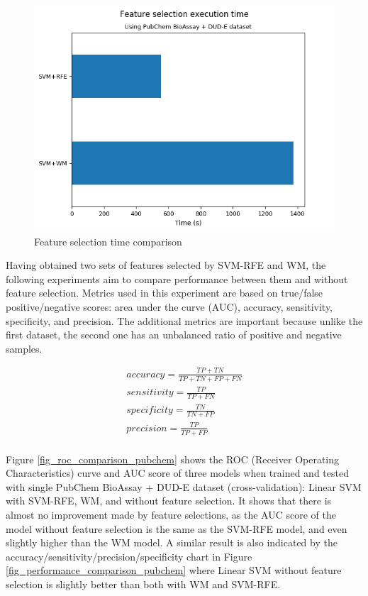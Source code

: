 \documentclass[conference]{IEEEtran}
\begin{document}
\begin{figure}
	\includegraphics[scale=0.5]{../images/feature_selection_time_comparison.png}
	\caption{Feature selection time comparison}
	\label{fig_feature_selection_time_comparison}
\end{figure}

Having obtained two sets of features selected by SVM-RFE and WM, the following experiments aim to compare performance between them and without feature selection. Metrics used in this experiment are based on true/false positive/negative scores: area under the curve (AUC), accuracy, sensitivity, specificity, and precision. The additional metrics are important because unlike the first dataset, the second one has an unbalanced ratio of positive and negative samples.

\begin{align}
	accuracy = \frac{TP + TN}{TP + TN + FP + FN} \\
	sensitivity = \frac{TP}{TP + FN} \\	
	specificity = \frac{TN}{TN + FP} \\		
	precision = \frac{TP}{TP + FP} \\			
	\label{eq_performance_metrics}
\end{align}

Figure \ref{fig_roc_comparison_pubchem} shows the ROC (Receiver Operating Characteristics) curve and AUC score of three models when trained and tested with single PubChem BioAssay + DUD-E dataset (cross-validation): Linear SVM with SVM-RFE, WM, and without feature selection. It shows that there is almost no improvement made by feature selections, as the AUC score of the model without feature selection is the same as the SVM-RFE model, and even slightly higher than the WM model. A similar result is also indicated by the accuracy/sensitivity/precision/specificity chart in Figure \ref{fig_performance_comparison_pubchem} where Linear SVM without feature selection is slightly better than both with WM and SVM-RFE.
\end{document}
